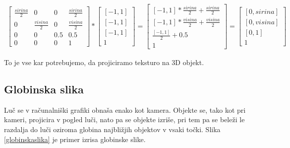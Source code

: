 \documentclass[a4paper, 12pt]{book}
\begin{document}
\begin{align}
\begin{bmatrix}
\frac{sirina}{2} & 0 & 0 & \frac{sirina}{2}\\ 
0 & \frac{visina}{2} & 0 & \frac{visina}{2}\\ 
0 & 0 & 0.5 & 0.5 \\ 
0 & 0 & 0 & 1
\end{bmatrix}
*
\begin{bmatrix}
[-1, 1] \\ [-1, 1] \\ [-1, 1] \\ 1
\end{bmatrix}
=
\begin{bmatrix}
[-1, 1]*\frac{sirina}{2} + \frac{sirina}{2}\\
[-1, 1]*\frac{visina}{2} + \frac{visina}{2}\\
\frac{[-1, 1]}{2} + 0.5 \\
1
\end{bmatrix}
=
\begin{bmatrix}
[0, sirina] \\
[0, visina] \\
[0, 1] \\
1
\end{bmatrix}
\label{zaslonenacba}
\end{align}

To je vse kar potrebujemo, da projiciramo teksturo na 3D objekt.

\subsection*{Globinska slika}
Luč se v računalniški grafiki obnaša enako kot kamera. Objekte se, tako kot pri kameri, projicira v pogled luči, nato pa se objekte izriše, pri tem pa se beleži le razdalja do luči oziroma globina najbližjih objektov v vsaki točki. Slika \ref{globinskaslika} je primer izrisa globinske slike.
\end{document}
